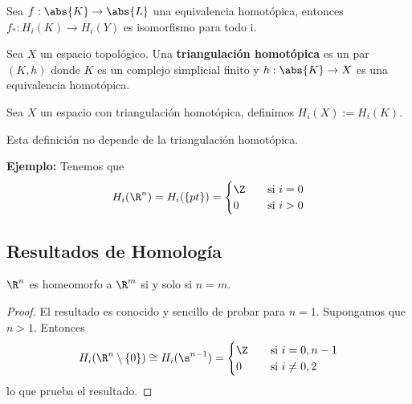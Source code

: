 \documentclass{article}
\begin{document}
\vspace{2mm}
\begin{cor}
    Sea $f:\abs{K}\to\abs{L}$ una equivalencia homotópica, entonces $f_{*}:H_{i}(K)\to H_{i}(Y)$
    es isomorfismo para todo i.
\end{cor}

\vspace{2mm}
\begin{dfn}
    Sea $X$ un espacio topológico. Una \textbf{triangulación homotópica} es un par $(K,h)$ donde 
    $K$ es un complejo simplicial finito y $h:\abs{K}\to X$ es una equivalencia homotópica.
\end{dfn}

\vspace{2mm}
\begin{dfn}
    Sea $X$ un espacio con triangulación homotópica, definimos $H_{i}(X):=H_{i}(K)$.
\end{dfn}

\vspace{2mm}
\begin{lema}
    Esta definición no depende de la triangulación homotópica.
\end{lema}

\vspace{2mm}
\noindent\textbf{Ejemplo:} Tenemos que
\begin{equation*}
    H_{i}(\R^{n})=H_{i}(\{pt\})=\begin{cases}
        \Z &\quad\text{si }i=0 \\
        0 &\quad\text{si }i>0
    \end{cases}
\end{equation*}

\newpage
\subsection{Resultados de Homología}
\begin{teo}
    $\R^{n}$ es homeomorfo a $\R^{m}$ si y solo si $n=m$.
\end{teo}

\begin{proof}
    El resultado es conocido y sencillo de probar para $n=1$. Supongamos que $n>1$. Entonces
    \begin{equation*}
        H_{i}(\R^{n}\setminus\{0\})\cong H_{i}(\s^{n-1})=\begin{cases}
            \Z &\quad\text{si }i=0,n-1 \\
            0 &\quad\text{si }i\neq0,2
        \end{cases}
    \end{equation*}
    lo que prueba el resultado.
\end{proof}
\end{document}
